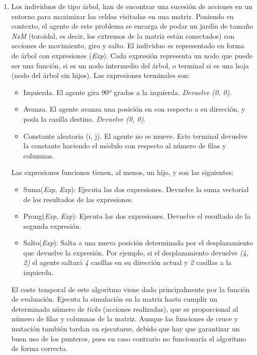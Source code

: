 \begin{enumerate}
		
			
		
		\item Los individuos de tipo árbol, han de encontrar una sucesión de acciones en un entorno para maximizar las celdas visitadas en una matriz. Poniendo en contexto, el agente de este problema se encarga de podar un jardín de tamaño \textit{NxM} (toroidal, es decir, los extremos de la matriz están conectados) con acciones de movimiento, giro y salto. El individuo es representado en forma de árbol con expresiones (\textit{Exp}). Cada expresión representa un nodo que puede ser una función, si es un nodo intermedio del árbol, o terminal si es una hoja (nodo del árbol sin hijos). Las expresiones terminales son:
		\begin{itemize}
			\item Izquierda. El agente gira 90º grados a la izquierda. \textit{Devuelve (0, 0)}.
			\item Avanza. El agente avanza una posición en con respecto a su dirección, y poda la casilla destino. \textit{Devuelve (0, 0)}.
			\item Constante aleatoria (i, j). El agente no se mueve. Este terminal devuelve la constante haciendo el módulo con respecto al número de filas y columnas.
		\end{itemize}
		
		Las expresiones funciones tienen, al menos, un hijo, y son las siguientes:
		\begin{itemize}
			\item Suma(\textit{Exp}, \textit{Exp}): Ejecuta las dos expresiones. Devuelve la suma vectorial de los resultados de las expresiones.
			\item Prong(\textit{Exp}, \textit{Exp}): Ejecuta las dos expresiones. Devuelve el resultado de la segunda expresión.
			\item Salto(\textit{Exp}): Salta a una nueva posición determinada por el desplazamiento que devuelve la expresión. Por ejemplo, si el desplazamiento devuelve \textit{(4, 2)} el agente saltará \textit{4} casillas en su dirección actual y \textit{2} casillas a la izquierda.
		\end{itemize}
		
				
		El coste temporal de este algoritmo viene dado principalmente por la función de evaluación. Ejecuta la simulación en la matriz hasta cumplir un determinado número de \textit{ticks} (acciones realizadas), que es proporcional al número de filas y columnas de la matriz. Aunque las funciones de cruce y mutación también tardan en ejecutarse, debido que hay que garantizar un buen uso de los punteros, pues en caso contrario no funcionaría el algoritmo de forma correcta.
	\end{enumerate}
	
